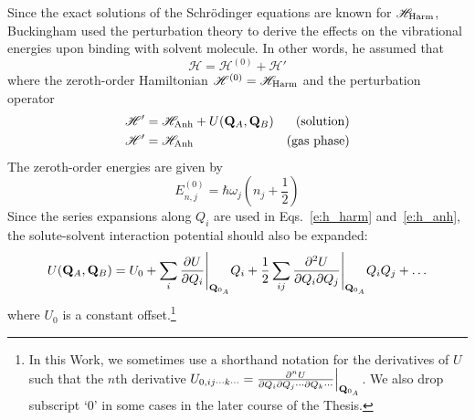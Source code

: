 \documentclass[b5paper,oneside,fleqn,11pt]{book}
\begin{document}
\begin{refsection}
Since the exact solutions of the Schr{\"o}dinger equations are known 
for $\mathscr{H}_{\rm Harm}$, Buckingham used the perturbation theory
to derive the effects on the vibrational energies upon binding with solvent
molecule. %
In other words, he assumed that
%
\begin{equation} \label{e:RSPT-Hamiltonian}
\mathscr{H} = \mathscr{H}^{(0)} + \mathscr{H}'
\end{equation}
%
where the zeroth\hyp{}order Hamiltonian $\mathscr{H}^{(0)}=\mathscr{H}_{\rm Harm}$
and the perturbation operator 
%
\begin{subequations} \label{e:RSPT-Hamiltonian:perturbation}
\begin{align}
\mathscr{H}'&=\mathscr{H}_{\rm Anh} + U({\bf Q}_A,{\bf Q}_B)  & \text{(solution)}\\
\mathscr{H}'&=\mathscr{H}_{\rm Anh}                           & \text{(gas phase)}
\end{align}
\end{subequations}
%
The zeroth\hyp{}order energies are given by
%
\begin{equation}
E_{n,j}^{(0)} = \hbar \omega_j \left( n_j+\frac{1}{2} \right)
\end{equation}
%
Since the series expansions along $Q_i$ are used in Eqs.~\eqref{e:h_harm}
and~\eqref{e:h_anh}, the solute\hyp{}solvent interaction potential
should also be expanded:
%
\begin{equation}\label{e:u_taylor}
U({\bf Q}_A,{\bf Q}_B) = 
U_0 + \sum_i \frac{\partial U}{\partial Q_i} \Bigg|_{{\bf Q}_{0_A}} Q_i
+ \frac{1}{2} \sum_{ij} \frac{\partial^2 U}{\partial Q_i \partial Q_j} \Bigg|_{{\bf Q}_{0_A}} Q_i Q_j
+ \ldots
\end{equation}
%
where $U_0$ is a constant offset.\footnote{
%
In this Work, we sometimes use a shorthand notation for the derivatives
of $U$ such that the $n$th derivative $U_{0,ij\cdots k\cdots}
= \frac{\partial^n U}{\partial Q_i\partial Q_j \cdots \partial Q_k \cdots} \Big|_{{\bf Q}_{0_A}}
$. We also drop subscript `0' in some cases in the later course of the Thesis. 
%
} 


\end{refsection}
\end{document}
